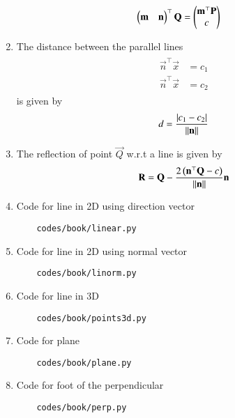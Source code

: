 \begin{enumerate}[label=\thesubsection.\arabic*.,ref=\thesubsection.\theenumi]
\begin{align}
	\label{eq:11/10/3/4/foot_of_perpendicular}
	\begin{pmatrix}\mathbf{m} & \mathbf{n}\end{pmatrix}^\top\mathbf{Q} &= 
	   \begin{pmatrix}
              \mathbf{m}^\top\mathbf{P}\\
	      c
	      \end{pmatrix}
\end{align}
\item The distance between the parallel lines 
\begin{align}
	\label{eq:parallel_lines}
	\begin{split}
		\vec{n}^{\top}\vec{x} &= c_1
		\\
		\vec{n}^{\top}\vec{x} &= c_2
	\end{split}
\end{align}
is given by 
\begin{align}
	\label{eq:dist_lines_2d}
	d = \frac{\left\vert   c_1-c_2 \right\vert}{\left\lVert\mathbf{n}\right\rVert}	
\end{align}
	\item 
The reflection of point $\vec{Q}$ w.r.t a line is given by
\begin{align}
	\label{eq:11/10/4/22}
\mathbf{R} = \mathbf{Q} -\frac{2\left(\mathbf{n}^{\top}\mathbf{Q}-c\right)}{\left\lVert\mathbf{n}\right\rVert}\mathbf{n}
\end{align}
\item Code for line in 2D using direction vector
	\begin{lstlisting}
	codes/book/linear.py
\end{lstlisting}
\item Code for line in 2D using normal vector
	\begin{lstlisting}
	codes/book/linorm.py
\end{lstlisting}
\item Code for line in 3D
	\begin{lstlisting}
	codes/book/points3d.py
\end{lstlisting}
\item Code for plane
	\begin{lstlisting}
	codes/book/plane.py
\end{lstlisting}
\item Code for foot of the perpendicular
	\begin{lstlisting}
	codes/book/perp.py
\end{lstlisting}
\end{enumerate}

